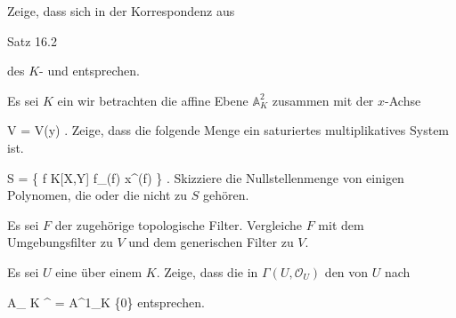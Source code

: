 {}
{





Zeige, dass sich in der Korrespondenz aus

Satz 16.2


des
$K$-
und
entsprechen.





}
{} {}

{}
{





Es sei $K$ ein
wir betrachten die affine Ebene ${\mathbb A}^{2}_{K}$ zusammen mit der $x$-Achse

\mavergleichskettedisp
{\vergleichskette
{ V
}
{ =} { V(y)
}
{ } {
}
{ } {
}
{ } {
}
}
{}{}{.}
Zeige, dass die folgende Menge ein saturiertes multiplikatives System ist.

\mavergleichskettedisp
{\vergleichskette
{S
}
{ =} { \left\{  f \in K[X,Y]   \mid   {} f_{\deg(f)}  x^{\deg(f)}          \right\}
}
{ } {
}
{ } {
}
{ } {
}
}
{}{}{.}
Skizziere die Nullstellenmenge von einigen Polynomen, die oder die nicht zu $S$ gehören.

Es sei $F$ der zugehörige topologische Filter. Vergleiche $F$ mit dem Umgebungsfilter zu $V$ und dem generischen Filter zu $V$.





}
{} {}

{}
{





Es sei $U$ eine
über einem
$K$. Zeige, dass die
in $\Gamma (U, {\mathcal O}_U )$ den
von $U$ nach

\mavergleichskette
{\vergleichskette
{ { {\mathbb A}_{ K }^{ \times  } }
}
{ = }{ {\mathbb A}^{1}_{K} \setminus \{0\}
}
{  }{
}
{    }{
}
{   }{
}
}
{}{}{}
entsprechen.





}
{} {}

